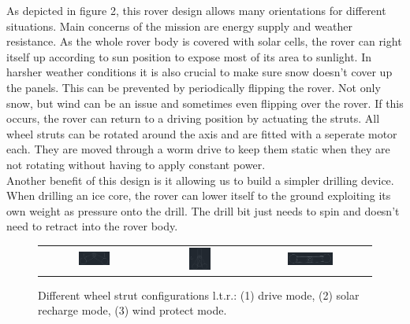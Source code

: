 \documentclass[a4paper,12pt]{article}
\begin{document}
As depicted in figure 2, this rover design allows many orientations for different situations. Main concerns of the mission are energy supply and weather resistance. As the whole rover body is covered with solar cells, the rover can right itself up according to sun position to expose most of its area to sunlight. In harsher weather conditions it is also crucial to make sure snow doesn't cover up the panels. This can be prevented by periodically flipping the rover. Not only snow, but wind can be an issue and sometimes even flipping over the rover. If this occurs, the rover can return to a driving position by actuating the struts. All wheel struts can be rotated around the axis and are fitted with a seperate motor each. They are moved through a worm drive to keep them static when they are not rotating without having to apply constant power. \\
Another benefit of this design is it allowing us to build a simpler drilling device. When drilling an ice core, the rover can lower itself to the ground exploiting its own weight as pressure onto the drill. The drill bit just needs to spin and doesn't need to retract into the rover body.

\begin{figure}[h!]
\centering
\begin{tabular}{ c  c  c }
\includegraphics[width=0.3\textwidth]{drive} & \includegraphics[width=0.25\textwidth]{upright} & \includegraphics[width=0.4\textwidth]{flat} \\
\end{tabular}
\caption{Different wheel strut configurations l.t.r.: (1) drive mode, (2) solar recharge mode, (3) wind protect mode.}
\end{figure}
\end{document}

